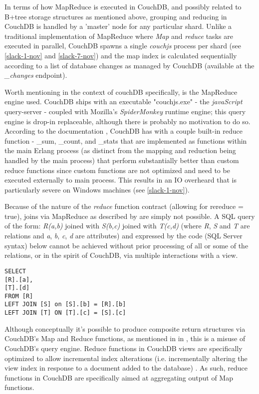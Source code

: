 In terms of how MapReduce is executed in CouchDB, and possibly related to B+tree storage structures as mentioned above, grouping and reducing in CouchDB is handled by a 'master' node for any particular shard. Unlike a traditional implementation of MapReduce where \textit{Map} and \textit{reduce} tasks are executed in parallel, CouchDB spawns a single \textit{couchjs} process per shard (see \ref{slack-1-nov} and \ref{slack-7-nov}) and the map index is calculated sequentially according to a list of database changes as managed by CouchDB (available at the \textit{\_changes} endpoint).

Worth mentioning in the context of couchDB specifically, is the MapReduce engine used. CouchDB ships with an executable "couchjs.exe" - the \textit{javaScript} query-server - coupled with Mozilla's \textit{SpiderMonkey} runtime engine; this query engine is drop-in replaceable, although there is probably no motivation to do so. According to the documentation \cite{builtincouchreduce}, CouchDB has with a couple built-in reduce function - \_sum, \_count, and \_stats that are implemented as functions within the main Erlang process (as distinct from the mapping and reduction being handled by the main process) that perform substantially better than custom reduce functions since custom functions are not optimized and need to be executed externally to main process. This results in an I\/O overheard that is particularly severe on Windows machines (see \ref{slack-1-nov}).

Because of the nature of the \textit{reduce} function contract (allowing for rereduce = true), joins via MapReduce as described by \cite{chandar2010} are simply not possible. A SQL query of the form: \textit{R(a,b)} joined with \textit{S(b,c)} joined with \textit{T(c,d)} (where \textit{R}, \textit{S} and \textit{T} are relations and \textit{a}, \textit{b}, \textit{c}, \textit{d} are attributes) and expressed by the code (SQL Server syntax) below cannot be achieved without prior processing of all or some of the relations, or in the spirit of CouchDB, via multiple interactions with a view.

\begin{verbatim}
SELECT
[R].[a],
[T].[d]
FROM [R]
LEFT JOIN [S] on [S].[b] = [R].[b]
LEFT JOIN [T] ON [T].[c] = [S].[c]
\end{verbatim}

Although conceptually it's possible to produce composite return structures via CouchDB's Map and Reduce functions, as mentioned in in \cite{reduceFunctions}, this is a misuse of CouchDB's query engine. Reduce functions in CouchDB views are specifically optimized to allow incremental index alterations (i.e. incrementally altering the view index in response to a document added to the database) \cite{reduceFunctions}. As such, reduce functions in CouchDB are specifically aimed at aggregating output of Map functions.

